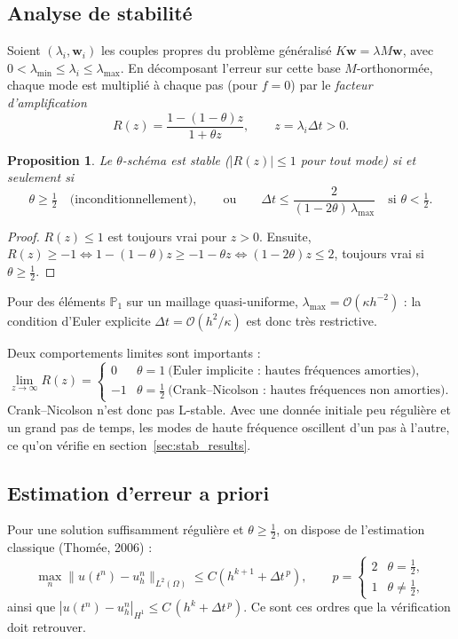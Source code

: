 \documentclass[11pt,a4paper]{article}
\newtheorem{proposition}{Proposition}
\begin{document}
\subsection{Analyse de stabilité}\label{sec:stab_theory}
Soient $(\lambda_i, \bm{w}_i)$ les couples propres du problème généralisé
$K\bm{w} = \lambda M \bm{w}$, avec $0<\lambda_{\min}\le\lambda_i\le\lambda_{\max}$. En décomposant
l'erreur sur cette base $M$-orthonormée, chaque mode est multiplié à chaque pas (pour $f=0$) par le
\emph{facteur d'amplification}
\begin{equation}\label{eq:amplif}
  R(z) = \frac{1 - (1-\theta)z}{1 + \theta z}, \qquad z = \lambda_i\Delta t > 0.
\end{equation}

\begin{proposition}
Le $\theta$-schéma est stable ($|R(z)|\le 1$ pour tout mode) si et seulement si
\[
  \theta\ge\tfrac12 \quad\text{(inconditionnellement)}, \qquad\text{ou}\qquad
  \Delta t \le \frac{2}{(1-2\theta)\,\lambda_{\max}} \quad \text{si } \theta<\tfrac12 .
\]
\end{proposition}
\begin{proof}
$R(z)\le 1$ est toujours vrai pour $z>0$. Ensuite, $R(z)\ge-1 \iff 1-(1-\theta)z \ge -1-\theta z
\iff (1-2\theta)z \le 2$, toujours vrai si $\theta\ge\frac12$.
\end{proof}

Pour des éléments $\mathbb{P}_1$ sur un maillage quasi-uniforme, $\lambda_{\max} = \mathcal{O}(\kappa h^{-2})$ :
la condition d'Euler explicite $\Delta t = \mathcal{O}(h^2/\kappa)$ est donc très restrictive.

Deux comportements limites sont importants :
\[
  \lim_{z\to\infty} R(z) =
  \begin{cases} 0 & \theta = 1 \ \text{(Euler implicite : hautes fréquences amorties)},\\
               -1 & \theta = \tfrac12 \ \text{(Crank--Nicolson : hautes fréquences non amorties)}.
  \end{cases}
\]
Crank--Nicolson n'est donc pas L-stable. Avec une donnée initiale peu régulière et un grand pas de
temps, les modes de haute fréquence oscillent d'un pas à l'autre, ce qu'on vérifie en
section~\ref{sec:stab_results}.

\subsection{Estimation d'erreur a priori}
Pour une solution suffisamment régulière et $\theta\ge\frac12$, on dispose de l'estimation classique
(Thomée, 2006) :
\begin{equation}\label{eq:apriori}
  \max_n \|u(t^n) - u_h^n\|_{L^2(\Omega)} \le C\left(h^{k+1} + \Delta t^{\,p}\right),
  \qquad p = \begin{cases} 2 & \theta = \frac12,\\ 1 & \theta \ne \frac12, \end{cases}
\end{equation}
ainsi que $|u(t^n)-u_h^n|_{H^1} \le C\,(h^{k} + \Delta t^{\,p})$. Ce sont ces ordres que la
vérification doit retrouver.
\end{document}
